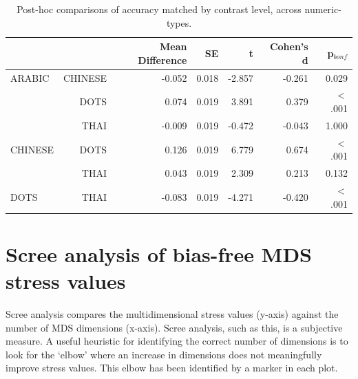 \begin{table}[htb]
	\centering
	\caption{Post-hoc comparisons of accuracy matched by contrast level, across numeric-types.}
	\begin{tabular}{lrrrrrr}
		\hline
		 &  & Mean Difference & SE & t & Cohen's d & p$_{bonf}$  \\
		\hline
		ARABIC & CHINESE & -0.052 & 0.018 & -2.857 & -0.261 & 0.029  \\
		  & DOTS & 0.074 & 0.019 & 3.891 & 0.379 & $<$ .001  \\
		 & THAI & -0.009 & 0.019 & -0.472 & -0.043 & 1.000  \\
		CHINESE & DOTS & 0.126 & 0.019 & 6.779 & 0.674 & $<$ .001  \\
		  & THAI & 0.043 & 0.019 & 2.309 & 0.213 & 0.132  \\
		DOTS & THAI & -0.083 & 0.019 & -4.271 & -0.420 & $<$ .001  \\
		\hline
	\end{tabular} 
\end{table}
\label{tab:ttest_MatchedLangAcc}


\section{Scree analysis of bias-free MDS stress values} 
\label{Appendix:MDS1}

Scree analysis compares the multidimensional stress values (y-axis) against the number of MDS dimensions (x-axis). Scree analysis, such as this, is a subjective measure. A useful heuristic for identifying the correct number of dimensions is to look for the `elbow' where an increase in dimensions does not meaningfully improve stress values. This elbow has been identified by a marker in each plot.

